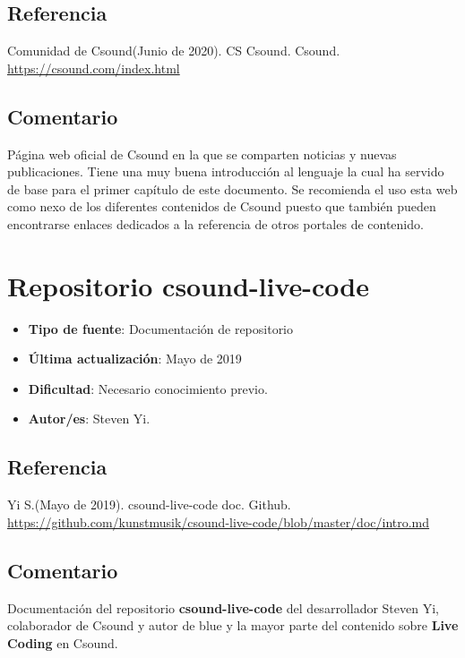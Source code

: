 \subsection{Referencia}

Comunidad de Csound(Junio de 2020). CS Csound. Csound. \url{https://csound.com/index.html}

\subsection{Comentario}

Página web oficial de Csound en la que se comparten noticias y nuevas publicaciones. Tiene una muy buena introducción al lenguaje la cual ha servido de base para el primer capítulo de este documento. Se recomienda el uso esta web como nexo de los diferentes contenidos de Csound puesto que también pueden encontrarse enlaces dedicados a la referencia de otros portales de contenido.

\section{Repositorio csound-live-code}

 \begin{itemize}
 \item \textbf{Tipo de fuente}: Documentación de repositorio
 
 \item \textbf{Última actualización}: Mayo de 2019
 
 \item \textbf{Dificultad}: Necesario conocimiento previo.
 
 \item \textbf{Autor/es}: Steven Yi.
 \end{itemize}

\subsection{Referencia}

Yi S.(Mayo de 2019). csound-live-code doc. Github. \url{https://github.com/kunstmusik/csound-live-code/blob/master/doc/intro.md}

\subsection{Comentario}

Documentación del repositorio \textbf{csound-live-code} del desarrollador Steven Yi, colaborador de Csound y autor de blue y la mayor parte del contenido sobre \textbf{Live Coding} en Csound.

